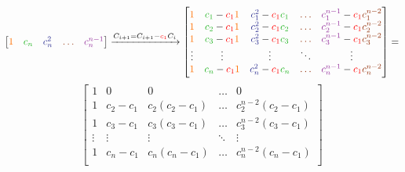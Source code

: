 \documentclass[11pt,a4paper]{article}
\begin{document}
{\[\begin{bmatrix}
\textcolor{Laranja}{1} & \textcolor{Verde}{c_n} & \textcolor{Blue}{c_n^2} & \textcolor{RawSienna}{\dots}  &  \textcolor{Purple}{c_n^{n-1}}\\ \end{bmatrix} \xrightarrow{C_{i+1} = C_{i+1} - \textcolor{red}{c_1}C_i} \begin{bmatrix} \textcolor{Laranja}{1} & \textcolor{Verde}{c_1} - \textcolor{red}{c_1}\textcolor{Laranja}{1}  & \textcolor{Blue}{c_1^2} - \textcolor{red}{c_1}\textcolor{Verde}{c_1} & \textcolor{RawSienna}{\dots}  & \textcolor{Purple}{c_1^{n-1}} - \textcolor{red}{c_1}\textcolor{RawSienna}{c_1^{n-2}}\\ 
\textcolor{Laranja}{1} & \textcolor{Verde}{c_2}  - \textcolor{red}{c_1}\textcolor{Laranja}{1}  &  \textcolor{Blue}{c_2^2} - \textcolor{red}{c_1}\textcolor{Verde}{c_2}  & \textcolor{RawSienna}{\dots}  & \textcolor{Purple}{c_2^{n-1}} - \textcolor{red}{c_1}\textcolor{RawSienna}{c_2^{n-2}}\\ 
\textcolor{Laranja}{1} &  \textcolor{Verde}{c_3}  - \textcolor{red}{c_1}\textcolor{Laranja}{1} & \textcolor{Blue}{c_3^2} - \textcolor{red}{c_1}\textcolor{Verde}{c_3}  & \textcolor{RawSienna}{\dots}  & \textcolor{Purple}{c_3^{n-1}} - \textcolor{red}{c_1}\textcolor{RawSienna}{c_3^{n-2}}\\
\vdots & \vdots & \vdots & \ddots  &\vdots \\ 
\textcolor{Laranja}{1} &  \textcolor{Verde}{c_n}  - \textcolor{red}{c_1}\textcolor{Laranja}{1}  & \textcolor{Blue}{c_n^2} - \textcolor{red}{c_1}\textcolor{Verde}{c_n} & \textcolor{RawSienna}{\dots}  & \textcolor{Purple}{c_n^{n-1}} - \textcolor{red}{c_1}\textcolor{RawSienna}{c_n^{n-2}}\\ \end{bmatrix}=\]
\[\begin{bmatrix} 1 & 0 & 0 & \dots & 0\\ 1 & c_2-c_1 & c_2(c_2-c_1) & \dots & c_2^{n-2}(c_2-c_1)\\ 1 & c_3-c_1 & c_3(c_3-c_1) & \dots & c_3^{n-2}(c_3-c_1)\\ \vdots & \vdots & \vdots & \ddots &\vdots \\ 1 & c_n-c_1 & c_n(c_n-c_1) & \dots & c_n^{n-2}(c_n-c_1)\\ \end{bmatrix}\]

}
\end{document}

